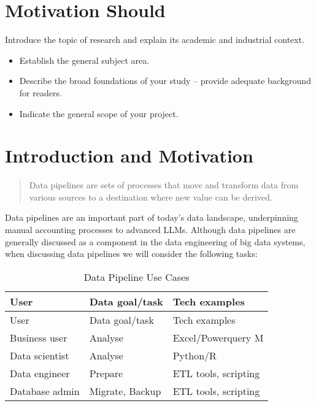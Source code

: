 \section{Motivation Should}\label{motivation-should}

Introduce the topic of research and explain its academic and industrial
context.

\begin{itemize}
\item
  Establish the general subject area.
\item
  Describe the broad foundations of your study -- provide adequate
  background for readers.
\item
  Indicate the general scope of your project.
\end{itemize}

\section{Introduction and Motivation}\label{introduction-and-motivation}

\begin{quote}
Data pipelines are sets of processes that move and transform data from
various sources to a destination where new value can be derived.
\citep[p.~1]{pipelines_pocket}
\end{quote}

Data pipelines are an important part of today's data landscape,
underpinning manual accounting processes to advanced LLMs. Although data
pipelines are generally discussed as a component in the data engineering
of big data systems, when discussing data pipelines we will consider the
following tasks:

\begin{longtable}[]{@{}lll@{}}
\caption{\label{tbl:table1}Data Pipeline Use Cases}\tabularnewline
\toprule\noalign{}
User & Data goal/task & Tech examples \\
\midrule\noalign{}
\endfirsthead
\toprule\noalign{}
User & Data goal/task & Tech examples \\
\midrule\noalign{}
\endhead
\bottomrule\noalign{}
\endlastfoot
Business user & Analyse & Excel/Powerquery M \\
Data scientist & Analyse & Python/R \\
Data engineer & Prepare & ETL tools, scripting \\
Database admin & Migrate, Backup & ETL tools, scripting \\
\end{longtable}

